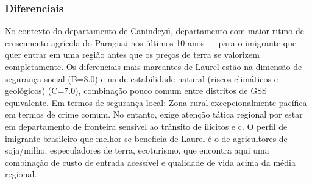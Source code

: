 \subsubsection*{Diferenciais}\label{dif-laurel-1416}
No contexto do departamento de Canindeyú, departamento com maior ritmo de crescimento agrícola do Paraguai nos últimos 10 anos — para o imigrante que quer entrar em uma região antes que os preços de terra se valorizem completamente. Os diferenciais mais marcantes de Laurel estão na dimensão de segurança social (B=8.0) e na de estabilidade natural (riscos climáticos e geológicos) (C=7.0), combinação pouco comum entre distritos de GSS equivalente. Em termos de segurança local: Zona rural excepcionalmente pacífica em termos de crime comum. No entanto, exige atenção tática regional por estar em departamento de fronteira sensível ao trânsito de ilícitos e c. O perfil de imigrante brasileiro que melhor se beneficia de Laurel é o de agricultores de soja/milho, especuladores de terra, ecoturismo, que encontra aqui uma combinação de custo de entrada acessível e qualidade de vida acima da média regional.
